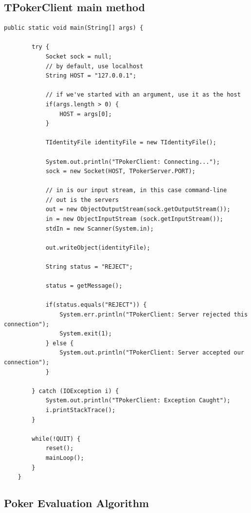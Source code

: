 \documentclass[11pt]{article}
\begin{document}
\subsection{TPokerClient main method}
\begin{lstlisting}[breaklines=true]
    public static void main(String[] args) {

        try {
            Socket sock = null;
            // by default, use localhost
            String HOST = "127.0.0.1";
            
            // if we've started with an argument, use it as the host
            if(args.length > 0) {
                HOST = args[0];
            }

            TIdentityFile identityFile = new TIdentityFile();

            System.out.println("TPokerClient: Connecting...");
            sock = new Socket(HOST, TPokerServer.PORT);

            // in is our input stream, in this case command-line
            // out is the servers
            out = new ObjectOutputStream(sock.getOutputStream());
            in = new ObjectInputStream (sock.getInputStream());
            stdIn = new Scanner(System.in);

            out.writeObject(identityFile);

            String status = "REJECT";

            status = getMessage();

            if(status.equals("REJECT")) {
                System.err.println("TPokerClient: Server rejected this connection");
                System.exit(1);
            } else {
                System.out.println("TPokerClient: Server accepted our connection");
            }

        } catch (IOException i) {
            System.out.println("TPokerClient: Exception Caught");
            i.printStackTrace();
        }

        while(!QUIT) {
            reset();
            mainLoop();
        }
    }
\end{lstlisting}
\newpage
\subsection{Poker Evaluation Algorithm}
\end{document}
